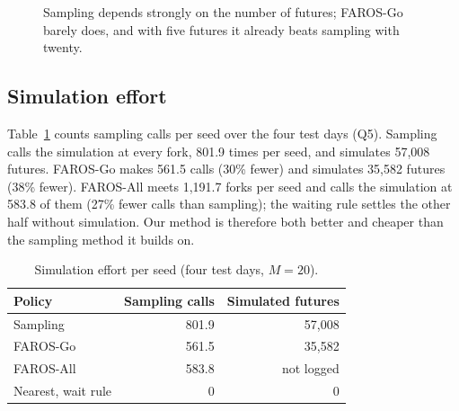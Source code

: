 \documentclass[5p,times,authoryear]{elsarticle}
\begin{document}
\begin{figure}[t]
\centering
{}
\caption{Sampling depends strongly on the number of futures; FAROS-Go barely does, and with five futures it already beats sampling with twenty.}
\label{fig:ablation-m}
\end{figure}

\subsection{Simulation effort}
\label{sec:compute}

Table~\ref{tab:compute} counts sampling calls per seed over the four test days (Q5). Sampling calls the simulation at every fork, 801.9 times per seed, and simulates 57,008 futures. FAROS-Go makes 561.5 calls (30\% fewer) and simulates 35,582 futures (38\% fewer). FAROS-All meets 1,191.7 forks per seed and calls the simulation at 583.8 of them (27\% fewer calls than sampling); the waiting rule settles the other half without simulation. Our method is therefore both better and cheaper than the sampling method it builds on.

\begin{table}[t]
\centering
\footnotesize
\caption{Simulation effort per seed (four test days, $M=20$).}
\label{tab:compute}
\begin{tabular}{@{}lrr@{}}
\toprule
Policy & Sampling calls & Simulated futures \\
\midrule
Sampling & 801.9 & 57{,}008 \\
FAROS-Go & 561.5 & 35{,}582 \\
FAROS-All & 583.8 & not logged \\
Nearest, wait rule & 0 & 0 \\
\bottomrule
\end{tabular}
\end{table}
\end{document}
